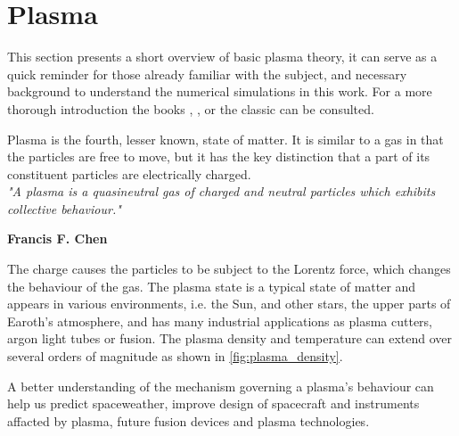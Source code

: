 \section{Plasma}
	\label{sec:plasma}
	This section presents a short overview of basic plasma theory, it can serve as a
	quick reminder for those already familiar with the subject, and necessary
	background to understand the numerical simulations in this work.
	For a more thorough introduction the books \textit{}
    \citep{fitzpatrick_plasma_2014}, \textit{} \citep{goldston_introduction_1995},
    \textit{} \citep{pecseli_waves_2012} or the classic
    \textit{} \citep{chen_introduction_1984} can be consulted.

	Plasma is the fourth, lesser known, state of matter. It is similar to a gas
	in that the particles are free to move, but it has the key distinction that
	a part of its constituent particles are electrically charged.
	\\[1.0cm]
	\indent \textit{\large"A plasma is a quasineutral gas of charged and neutral particles which exhibits
	collective behaviour."}
	\begin{flushright}
	    \textbf{Francis F. Chen}\\[1.0cm]
	\end{flushright}
	The charge causes the particles to be subject to the Lorentz force, which
	changes the behaviour of the gas. The plasma state is a typical state of matter
	and appears in various environments, i.e. the Sun, and other stars, the upper parts of Earoth's atmosphere,
 	and has many industrial applications as plasma cutters, argon light tubes or fusion.
	The plasma density and temperature can extend over several orders of magnitude as shown in \cref{fig:plasma_density}.

	A better understanding of the mechanism governing a plasma's behaviour can help
	us predict spaceweather, improve design of spacecraft and instruments affacted by plasma, future fusion devices and plasma technologies.

